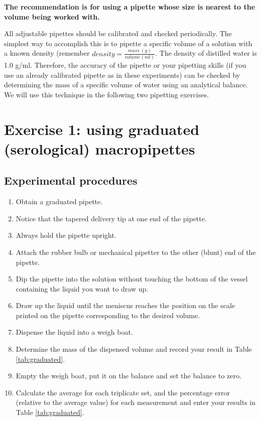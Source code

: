 \documentclass[]{book}
\providecommand{\tightlist}{%
  \setlength{\itemsep}{0pt}\setlength{\parskip}{0pt}}
\theoremstyle{definition}
\theoremstyle{definition}
\theoremstyle{definition}
\theoremstyle{remark}
\let\BeginKnitrBlock\begin \let\EndKnitrBlock\end
\begin{document}
\BeginKnitrBlock{rmdnote}
\textbf{The recommendation is for using a pipette whose size is nearest
to the volume being worked with.}
\EndKnitrBlock{rmdnote}

All adjustable pipettes should be calibrated and checked periodically.
The simplest way to accomplish this is to pipette a specific volume of a
solution with a known density (remember
\(density = \frac{mass\ (g)}{volume (ml)}\). The density of distilled
water is 1.0 g/ml. Therefore, the accuracy of the pipette or your
pipetting skills (if you use an already calibrated pipette as in these
experiments) can be checked by determining the mass of a specific volume
of water using an analytical balance. We will use this technique in the
following two pipetting exercises.

\section{Exercise 1: using graduated (serological)
macropipettes}\label{exercise-1-using-graduated-serological-macropipettes}

\subsection{Experimental procedures}\label{experimental-procedures-4}

\begin{enumerate}
\def\labelenumi{\arabic{enumi}.}
\tightlist
\item
  Obtain a graduated pipette.
\item
  Notice that the tapered delivery tip at one end of the pipette.
\item
  Always hold the pipette upright.
\item
  Attach the rubber bulb or mechanical pipetter to the other (blunt) end
  of the pipette.
\item
  Dip the pipette into the solution without touching the bottom of the
  vessel containing the liquid you want to draw up.
\item
  Draw up the liquid until the meniscus reaches the position on the
  scale printed on the pipette corresponding to the desired volume.
\item
  Dispense the liquid into a weigh boat.
\item
  Determine the mass of the dispensed volume and record your result in
  Table \ref{tab:graduated}.
\item
  Empty the weigh boat, put it on the balance and set the balance to
  zero.
\item
  Calculate the average for each triplicate set, and the percentage
  error (relative to the average value) for each measurement and enter
  your results in Table \ref{tab:graduated}.
\end{enumerate}
\end{document}
